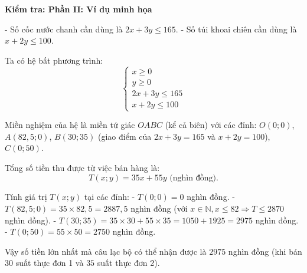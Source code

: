 \documentclass[12pt,a4paper]{article}
\newenvironment{quiz}[1]{
	\noindent\textbf{\Large Kiểm tra: #1}
}{}
\begin{document}
\begin{quiz}{Phần II: Ví dụ minh họa}
{- Số cốc nước chanh cần dùng là $2x + 3y \le 165$.
- Số túi khoai chiên cần dùng là $x + 2y \le 100$.

Ta có hệ bất phương trình:
$$\begin{cases} x \ge 0 \\ y \ge 0 \\ 2x + 3y \le 165 \\ x + 2y \le 100 \end{cases}$$

Miền nghiệm của hệ là miền tứ giác $OABC$ (kể cả biên) với các đỉnh:
$O(0; 0)$, $A(82{,}5; 0)$, $B(30; 35)$ (giao điểm của $2x + 3y = 165$ và $x + 2y = 100$), $C(0; 50)$.

Tổng số tiền thu được từ việc bán hàng là:
$$T(x; y) = 35x + 55y \text{ (nghìn đồng)}.$$

Tính giá trị $T(x; y)$ tại các đỉnh:
- $T(0; 0) = 0$ nghìn đồng.
- $T(82{,}5; 0) = 35 \times 82{,}5 = 2887{,}5$ nghìn đồng (với $x \in \mathbb{N}, x \le 82 \Rightarrow T \le 2870$ nghìn đồng).
- $T(30; 35) = 35 \times 30 + 55 \times 35 = 1050 + 1925 = 2975$ nghìn đồng.
- $T(0; 50) = 55 \times 50 = 2750$ nghìn đồng.

Vậy số tiền lớn nhất mà câu lạc bộ có thể nhận được là $2975$ nghìn đồng (khi bán $30$ suất thực đơn 1 và $35$ suất thực đơn 2).}

\end{quiz}

\end{document}
